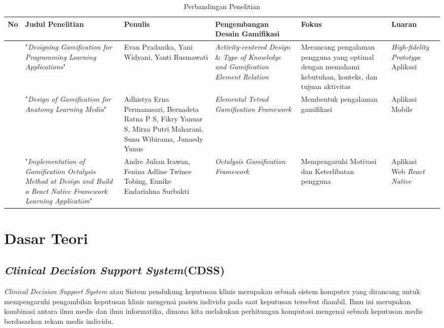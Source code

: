 \begin{landscape}
	\begin{table}[htbp]
	\caption{Perbandingan Penelitian}
	\centering
	\begin{tabular}{|>{\centering\arraybackslash}m{0.5cm}|m{4cm}|m{3.5cm}|m{4.5cm}|m{4.5cm}|m{4cm}|m{4cm}|}
		\hline
		\centering \textbf{No} & \centering \textbf{Judul Penelitian} & \centering \textbf{Penulis} & \centering  \textbf{Pengembangan Desain Gamifikasi} &\centering\textbf{Fokus}&\multicolumn{1}{m{4cm}|}{\centering\textbf{Luaran}} \\
		\hline 
		1 & "\textit{Designing Gamification for Programming Learning Applications}"
		& 
		Evan Pradanika, Yani Widyani,  Yanti Rusmawati
		& \textit{Activity-centered Design} \& \textit{Type of Knowledge and Gamification Element Relation}& Merancang pengalaman pengguna yang optimal dengan memahami kebutuhan, konteks, dan tujuan aktivitas& \textit{High-fidelity Prototype} Aplikasi\\
		\hline
		2 &"\textit{Design of Gamification for Anatomy Learning Media}" 
		& 
		Adhistya Erna Permanasari, Bernadeta Ratna P S, Fikry Yanuar S, Mirza Putri Maharani, Sunu Wibirama, Junaedy Yunus
		& \textit{Elemental Tetrad Gamification Framework} & Membentuk pengalaman gamifikasi & Aplikasi Mobile\\
		\hline
		3 & 
		"\textit{Implementation of Gamification Octalysis Method at Design and Build a React Native Framework Learning Application}" 
		& 
		Andre Julian Irawan, Fenina Adline Twince Tobing, Eunike Endariahna Surbakti
		& \textit{Octalysis Gamification Framework}& Mempengaruhi Motivasi dan Keterlibatan pengguna & Aplikasi Web \textit{React Native}\\
		\hline
	  \end{tabular}
	  \label{Tab: Tabel perbandingan metode}
	\end{table}
\end{landscape}

\newpage
\section{Dasar Teori}
\subsection{\textit{Clinical Decision Support System}(CDSS)}
\textit{Clinical Decision Support System} atau Sistem pendukung keputusan klinis merupakan sebuah sistem komputer yang dirancang untuk mempengaruhi pengambilan keputusan klinis mengenai pasien individu pada saat keputusan tersebut diambil\cite{sutton2020overview}.
Ilmu ini merupakan kombinasi antara ilmu medis dan ilmu informatika, dimana kita melakukan perhitungan komputasi mengenai sebuah keputusan medis berdasarkan rekam medis individu.
